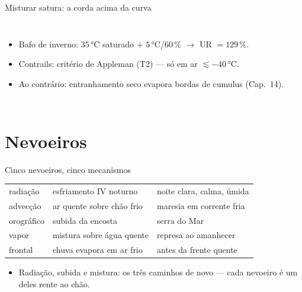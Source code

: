 \documentclass[aspectratio=169,11pt]{beamer}
\begin{document}
\begin{frame}{Misturar satura: a corda acima da curva}
  \begin{columns}
    \vspace{0.4em}
    \begin{itemize}
      \item Bafo de inverno: $35\,°$C saturado $+$ $5\,°$C/60\,\%
            $\to$ UR $= 129\,\%$.
      \item Contrails: critério de Appleman (T2) — só em ar
            $\lesssim -40\,°$C.
      \item Ao contrário: entranhamento seco \alert{evapora} bordas de
            cumulus (Cap.~14).
    \end{itemize}
  \end{columns}
\end{frame}

\section{Nevoeiros}

\begin{frame}{Cinco nevoeiros, cinco mecanismos}
  \centering
  \begin{tabular}{lll}
    \hline
    radiação & esfriamento IV noturno & noite clara, calma, úmida \\
    advecção & ar quente sobre chão frio & maresia em corrente fria \\
    orográfico & subida da encosta & serra do Mar \\
    vapor & mistura sobre água quente & represa ao amanhecer \\
    frontal & chuva evapora em ar frio & antes da frente quente \\
    \hline
  \end{tabular}
  \vspace{0.6em}
  \begin{itemize}
    \item Radiação, subida e mistura: os três caminhos de novo — cada
          nevoeiro é um deles rente ao chão.
  \end{itemize}
\end{frame}
\end{document}
